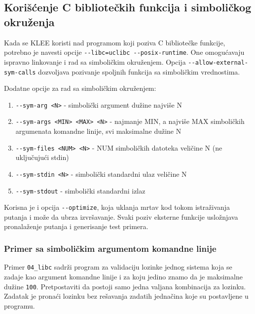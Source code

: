 \subsection{Korišćenje C bibliotečkih funkcija i simboličkog okruženja}\label{koriux161ux107enje-c-biblioteux10dkih-funkcija-i-simboliux10dkog-okruux17eenja}

Kada se KLEE koristi nad programom koji poziva C bibliotečke funkcije, potrebno je navesti opcije \texttt{-{}-libc=uclibc -{}-posix-runtime}. One omogućavaju ispravno linkovanje i rad sa simboličkim okruženjem. Opcija \texttt{-{}-allow-external-sym-calls} dozvoljava pozivanje spoljnih funkcija sa simboličkim vrednostima.

Dodatne opcije za rad sa simboličkim okruženjem:

\begin{enumerate}
\def\labelenumi{\arabic{enumi}.}
\tightlist
\item
  \texttt{-{}-sym-arg\ \textless{}N\textgreater{}} - simbolički argument dužine najviše N ~
\item
  \texttt{-{}-sym-args\ \textless{}MIN\textgreater{}\ \textless{}MAX\textgreater{}\ \textless{}N\textgreater{}} - najmanje MIN, a najviše MAX simboličkih argumenata komandne linije, svi maksimalne dužine N ~
\item
  \texttt{-{}-sym-files\ \textless{}NUM\textgreater{}\ \textless{}N\textgreater{}} - NUM simboličkih datoteka veličine N (ne uključujući stdin) ~
\item
  \texttt{-{}-sym-stdin\ \textless{}N\textgreater{}} - simbolički standardni ulaz veličine N ~
\item
  \texttt{-{}-sym-stdout} - simbolički standardni izlaz
\end{enumerate}

Korisna je i opcija \texttt{-{}-optimize}, koja uklanja mrtav kod tokom istraživanja putanja i može da ubrza izvršavanje. Svaki poziv eksterne funkcije usložnjava pronalaženje putanja i generisanje test primera.

\subsubsection{Primer sa simboličkim argumentom komandne linije}\label{primer-sa-simboliux10dkim-argumentom-komandne-linije}

Primer \texttt{04\_libc} sadrži program za validaciju lozinke jednog sistema koja se zadaje kao argument komandne linije i za koju jedino znamo da je maksimalne dužine \texttt{100}. Pretpostaviti da postoji samo jedna valjana kombinacija za lozinku. Zadatak je pronaći lozinku bez rešavanja zadatih jednačina koje su postavljene u programu.

